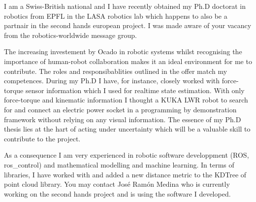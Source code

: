 \documentclass[11pt, a4paper]{awesome-cv}
\begin{document}
\makecvheader

\makelettertitle

\begin{cvletter}


I am a Swiss-British national and I have recently obtained my Ph.D doctorat in robotics from 
EPFL in the LASA robotics lab  which happens to also be a partnair in the second hands european project.  
I was made aware of your vacancy from the robotics-worldwide message group. 



The increasing investement by Ocado in robotic systems whilst recognising the importance of 
human-robot collaboration makes it an ideal environment for me to contribute. The roles and 
responsibablities outlined in the offer match my competences. During my 
Ph.D I have, for instance, closely worked with force-torque sensor information which I used 
for realtime state estimation. With only force-torque and kinematic information I thought a KUKA LWR 
robot to search for and connect an electric power socket in a programming by demonstration
framework without relying on any visual information. The essence of my Ph.D thesis lies at the 
hart of acting under uncertainty which will be a valuable skill to contribute to the project. 

As a consequence I am very experienced in robotic software developpment (ROS, ros\_control)
and mathematical modelling and machine learning. In terms of libraries, I have worked with and added 
a new distance metric to the KDTree of point cloud library. You may contact José Ramón Medina 
who is currently working on the second hands project and is using the software I developed.


\end{cvletter}
\end{document}
